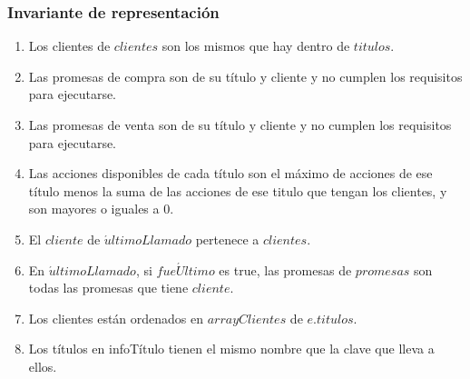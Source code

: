 \subsubsection{Invariante de representaci\'on}
 \renewcommand{\labelenumi}{(\Roman{enumi})}
 \begin{enumerate}
 	\item Los clientes de $clientes$ son los mismos que hay dentro de $titulos$.
 	\item Las promesas de compra son de su t\'itulo y cliente y no cumplen los requisitos para ejecutarse.
 	\item Las promesas de venta son de su t\'itulo y cliente y no cumplen los requisitos para ejecutarse.
 	\item Las acciones disponibles de cada t\'itulo son el m\'aximo de acciones de ese t\'itulo menos la suma de las acciones de ese titulo que tengan los clientes, y son mayores o iguales a 0.
 	\item El $cliente$ de $\acute{u}ltimoLlamado$ pertenece a $clientes$.
 	\item En $\acute{u}ltimoLlamado$, si $fue\acute{U}ltimo$ es true, las promesas de $promesas$ son todas las promesas que tiene $cliente$.
 	\item Los clientes est\'an ordenados en $arrayClientes$ de $e.titulos$.
 	\item Los t\'itulos en infoT\'itulo tienen el mismo nombre que la clave que lleva a ellos.
  \end{enumerate}
  
